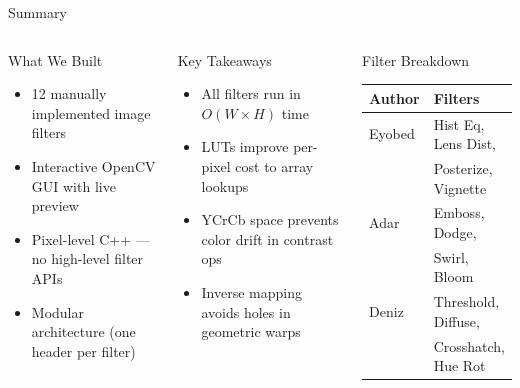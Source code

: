 \documentclass[aspectratio=169]{beamer}
\begin{document}
\begin{frame}{Summary}
  \begin{columns}[T]
      \begin{block}{What We Built}
        \begin{itemize}
          \item 12 manually implemented image filters
          \item Interactive OpenCV GUI with live preview
          \item Pixel-level C++ — no high-level filter APIs
          \item Modular architecture (one header per filter)
        \end{itemize}
      \end{block}
      \vspace{0.3cm}
      \begin{block}{Key Takeaways}
        \begin{itemize}
          \item All filters run in $O(W \times H)$ time
          \item LUTs improve per-pixel cost to array lookups
          \item YCrCb space prevents color drift in contrast ops
          \item Inverse mapping avoids holes in geometric warps
        \end{itemize}
      \end{block}
      \begin{block}{Filter Breakdown}
        \small
        \begin{tabular}{ll}
          \toprule
          \textbf{Author} & \textbf{Filters} \\
          \midrule
          Eyobed & Hist Eq, Lens Dist,\\
                 & Posterize, Vignette\\
          \midrule
          Adar   & Emboss, Dodge,\\
                 & Swirl, Bloom\\
          \midrule
          Deniz  & Threshold, Diffuse,\\
                 & Crosshatch, Hue Rot\\
          \bottomrule
        \end{tabular}
      \end{block}
  \end{columns}
\end{frame}
\end{document}
